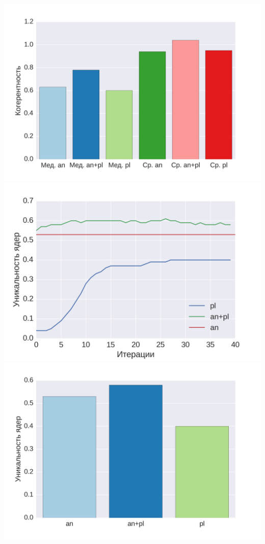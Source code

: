 \documentclass[a4paper, 14pt]{extarticle}
\begin{document}
\includegraphics[scale=0.43]{img/anpl/6}\\
\includegraphics[scale=0.43]{img/anpl/4}
\includegraphics[scale=0.43]{img/anpl/7}
\end{document}
